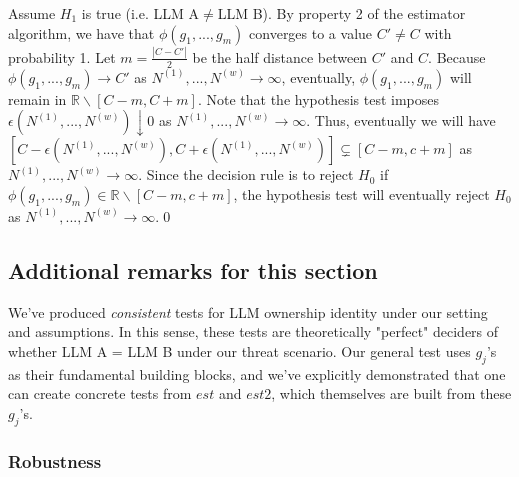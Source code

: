 \documentclass{article}
\begin{document}
Assume $\displaystyle H_{1}$ is true (i.e. LLM A$\displaystyle \neq $LLM B). By property 2 of the estimator algorithm, we have that $\displaystyle \phi \left( g_{1} ,...,g_{m}\right)$ converges to a value $\displaystyle C'\neq C$ with probability 1. Let $\displaystyle m=\frac{|C-C'|}{2}$ be the half distance between $\displaystyle C'$ and $\displaystyle C$. Because $\displaystyle \phi \left( g_{1} ,...,g_{m}\right)\rightarrow C'$ as $\displaystyle N^{\left( 1\right)} ,...,N^{\left( w\right)}\rightarrow \infty $, eventually, $\displaystyle \phi \left( g_{1} ,...,g_{m}\right)$ will remain in $\displaystyle \mathbb{R} \backslash \left[ C-m,C+m\right]$. Note that the hypothesis test imposes $\displaystyle \epsilon \left( N^{\left( 1\right)} ,...,N^{\left( w\right)}\right) \downarrow 0$ as $\displaystyle N^{\left( 1\right)} ,...,N^{\left( w\right)}\rightarrow \infty $. Thus, eventually we will have $\displaystyle \left[ C-\epsilon \left( N^{\left( 1\right)} ,...,N^{\left( w\right)}\right) ,C+\epsilon \left( N^{\left( 1\right)} ,...,N^{\left( w\right)}\right)\right] \varsubsetneq \left[ C-m,c+m\right]$ as $\displaystyle N^{\left( 1\right)} ,...,N^{\left( w\right)}\rightarrow \infty $. Since the decision rule is to reject $\displaystyle H_{0}$ if $\displaystyle \phi \left( g_{1} ,...,g_{m}\right) \in \mathbb{R} \backslash \left[ C-m,c+m\right]$, the hypothesis test will eventually reject $\displaystyle H_{0}$ as $\displaystyle N^{\left( 1\right)} ,...,N^{\left( w\right)}\rightarrow \infty $.\qed 



\subsection{Additional remarks for this section}

We've produced \textit{consistent} tests for LLM ownership identity under our setting and assumptions. In this sense, these tests are theoretically "perfect" deciders of whether LLM A = LLM B under our threat scenario. Our general test uses $\displaystyle g_{j}$'s as their fundamental building blocks, and we've explicitly demonstrated that one can create concrete tests from $\displaystyle est$ and $\displaystyle est2$, which themselves are built from these $\displaystyle g_{j}$'s.



\subsubsection{Robustness}
\end{document}
